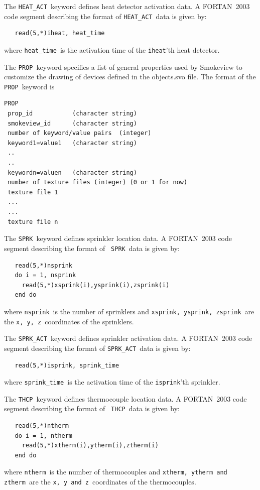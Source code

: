 \documentclass[11pt,twoside]{book}
\begin{document}
The {\tt HEAT\_ACT}\ keyword defines heat detector
activation data. A FORTAN~2003 code segment describing the format
of {\tt HEAT\_ACT}\ data is given by:
\begin{lstlisting}
   read(5,*)iheat, heat_time
\end{lstlisting}
where {\tt heat\_time}\ is the activation time of the {\tt iheat}'th heat
detector.

The {\tt PROP}\ keyword specifies
a list of general properties used
by Smokeview to customize the drawing of devices defined in
the objects.svo file.
The format of the {\tt PROP}\ keyword is

\begin{lstlisting}
PROP
 prop_id           (character string)
 smokeview_id      (character string)
 number of keyword/value pairs  (integer)
 keyword1=value1   (character string)
 ..
 ..
 keywordn=valuen   (character string)
 number of texture files (integer) (0 or 1 for now)
 texture file 1
 ...
 ...
 texture file n
\end{lstlisting}

The {\tt SPRK}\ keyword defines sprinkler location
data. A FORTAN~2003 code segment describing the format of {\tt
SPRK}\ data is given by:
\begin{lstlisting}
   read(5,*)nsprink
   do i = 1, nsprink
     read(5,*)xsprink(i),ysprink(i),zsprink(i)
   end do
\end{lstlisting}
where {\tt nsprink}\ is the number of sprinklers and
{\tt xsprink, ysprink, zsprink}\ are the {\tt x, y, z}\
coordinates of the sprinklers.

The {\tt SPRK\_ACT}\ keyword defines sprinkler
activation data. A FORTAN~2003 code segment describing the format
of {\tt SPRK\_ACT}\ data is given by:
\begin{lstlisting}
   read(5,*)isprink, sprink_time
\end{lstlisting}
where {\tt sprink\_time}\ is the activation time of the {\tt isprink}'th sprinkler.

The {\tt THCP}\ keyword defines thermocouple location
data. A FORTAN~2003 code segment describing the format of {\tt
THCP}\ data is given by:
\begin{lstlisting}
   read(5,*)ntherm
   do i = 1, ntherm
     read(5,*)xtherm(i),ytherm(i),ztherm(i)
   end do
\end{lstlisting}
where {\tt ntherm}\ is the number of thermocouples and
{\tt xtherm, ytherm and ztherm}\ are the {\tt x, y and z}\
coordinates of the thermocouples.
\end{document}
